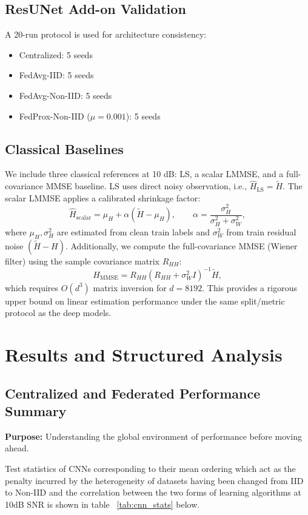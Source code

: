 \documentclass{llncs}
\begin{document}
\subsection{ResUNet Add-on Validation}
A 20-run protocol is used for architecture consistency:
\begin{itemize}
    \item Centralized: 5 seeds
    \item FedAvg-IID: 5 seeds
    \item FedAvg-Non-IID: 5 seeds
    \item FedProx-Non-IID ($\mu=0.001$): 5 seeds
\end{itemize}

\subsection{Classical Baselines}
We include three classical references at 10 dB: LS, a scalar LMMSE, and a full-covariance MMSE baseline. LS uses direct noisy observation, i.e., $\hat H_{\mathrm{LS}}=\tilde H$. The scalar LMMSE applies a calibrated shrinkage factor:
\begin{equation}
\hat H_{\mathrm{scalar}} = \mu_H + \alpha(\tilde H-\mu_H),\qquad
\alpha = \frac{\sigma_H^2}{\sigma_H^2+\sigma_W^2},
\end{equation}
where $\mu_H,\sigma_H^2$ are estimated from clean train labels and $\sigma_W^2$ from train residual noise $(\tilde H-H)$. Additionally, we compute the full-covariance MMSE (Wiener filter) using the sample covariance matrix $R_{HH}$:
\begin{equation}
\hat H_{\mathrm{MMSE}} = R_{HH}(R_{HH}+\sigma_W^2 I)^{-1}\tilde H,
\end{equation}
which requires $O(d^3)$ matrix inversion for $d=8192$. This provides a rigorous upper bound on linear estimation performance under the same split/metric protocol as the deep models.

\section{Results and Structured Analysis}
\subsection{Centralized and Federated Performance Summary}
\textbf{Purpose:} Understanding the global environment of performance before moving ahead.

Test statistics of CNNs corresponding to their mean ordering which act as the penalty incurred by the heterogeneity of datasets having been changed from IID to Non-IID and the correlation between the two forms of learning algorithms at 10dB SNR is shown in table ~\ref{tab:cnn_stats} below.
\end{document}
